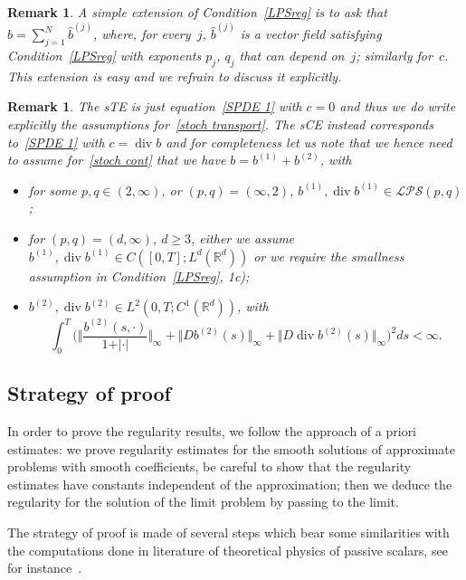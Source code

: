 \documentclass[a4paper,10pt]{article}
\newtheorem{remark}[theorem]{Remark}
\newcommand\1{\mathbbm{1}}
\DeclareMathOperator{\diverg}{div}
\numberwithin{equation}{section}
\begin{document}
\begin{remark}
A simple extension of Condition~\ref{LPSreg} is to ask that $b=\sum_{j=1}^{N} \hat{b}^{(j)}$, where, for every~$j$, $\hat{b}^{(j)}$ is a vector field satisfying Condition~\ref{LPSreg} with exponents $p_{j}$, $q_{j}$ that can depend on~$j$; similarly for~$c$. This extension is easy and we refrain to discuss it explicitly.
\end{remark}

\begin{remark}
\label{Remark assumptions sCE}
The sTE is just equation~\eqref{SPDE 1} with $c=0$ and thus we do write explicitly the assumptions for~\eqref{stoch transport}. The sCE instead corresponds to~\eqref{SPDE 1} with $c=\diverg b$ and for completeness let us note that we hence need to assume for~\eqref{stoch cont} that we have $b=b^{(1)}+b^{(2)}$, with
\begin{itemize}[font=\normalfont]
  \item[(i$_{0}$)] for some $p,q\in(2,\infty)$, or $(p,q)
=(\infty,2)$, $b^{(1)},\diverg b^{(1)} \in \mathcal{LPS}(p,q)$;
  \item[(i$_{1}$)] for $(p,q)  =(d,\infty)$, $d\geq3$, either we assume $b^{(1)}, \diverg b^{(1)} \in C([0,T];L^{d}(\mathbb{R}^{d}))$ or we require the smallness assumption in Condition~\ref{LPSreg}, \textup{1c)};
  \item[(ii)] $b^{(2)},\diverg b^{(2)}\in L^{2}(0,T;C^{1}(\mathbb{R}^{d}))$, with
\[
\int_{0}^{T}\Big(\Big\Vert \frac{b^{(2)}(s,\cdot)}{1+\vert \cdot\vert} \Big\Vert_{\infty
}+\big\Vert Db^{(2)}(s)  \big\Vert_{\infty}+ \big\Vert D\diverg b^{(2)} (s)
\big\Vert_{\infty}\Big)^2  ds<\infty .
\]
\end{itemize}
\end{remark}


\subsection{Strategy of proof}
\label{subsection_strategy_regularity}

In order to prove the regularity results, we follow the approach of a priori estimates: we prove regularity estimates for the smooth solutions of approximate problems with smooth coefficients, be careful to show that the regularity estimates have constants independent of the approximation; then we deduce the regularity for the solution of the limit problem by passing to the limit.

The strategy of proof is made of several steps which bear some similarities with the computations done in literature of theoretical physics of passive scalars, see for instance~\cite{CHAGAWHORKUPVER03}.
\end{document}
